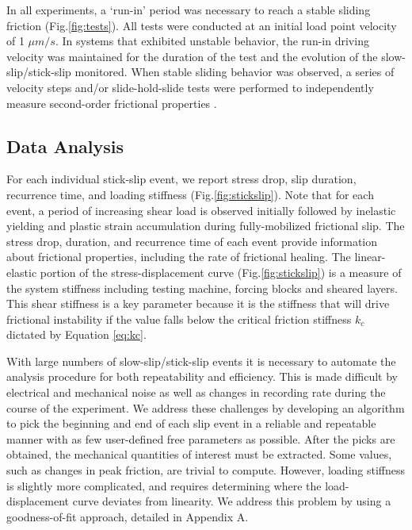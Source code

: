 In all experiments, a `run-in' period was necessary to reach a stable sliding
friction (Fig.\ref{fig:tests}).  All tests were conducted at an initial load
point velocity of 1 $\mu m/s$.  In systems that exhibited unstable behavior, the
run-in driving velocity was maintained for the duration of the test and the
evolution of the slow-slip/stick-slip monitored.  When stable sliding behavior
was observed, a series of velocity steps and/or slide-hold-slide tests were
performed to independently measure second-order frictional properties
\cite{Marone_1998}.

\subsection{Data Analysis}

For each individual stick-slip event, we report stress drop, slip duration,
recurrence time, and loading stiffness (Fig.\ref{fig:stickslip}). Note that for
each event, a period of increasing shear load is observed initially followed by
inelastic yielding and plastic strain accumulation during fully-mobilized
frictional slip. The stress drop, duration, and recurrence time of each event
provide information about frictional properties, including the rate of
frictional healing. The linear-elastic portion of the stress-displacement curve
(Fig.\ref{fig:stickslip}) is a measure of the system stiffness including testing
machine, forcing blocks and sheared layers. This shear stiffness is a key
parameter because it is the stiffness that will drive frictional instability if
the value falls below the critical friction stiffness $k_c$ dictated by Equation
\ref{eq:kc}.

With large numbers of slow-slip/stick-slip events it is necessary to automate
the analysis procedure for both repeatability and efficiency.  This is made
difficult by electrical and mechanical noise as well as changes in recording
rate during the course of the experiment.  We address these challenges by
developing an algorithm to pick the beginning and end of each slip event in a
reliable and repeatable manner with as few user-defined free parameters as
possible.  After the picks are obtained, the mechanical quantities of interest
must be extracted.  Some values, such as changes in peak friction, are trivial
to compute.  However, loading stiffness is slightly more complicated, and
requires determining where the load-displacement curve deviates from linearity.
We address this problem by using a goodness-of-fit approach, detailed in
Appendix A.


